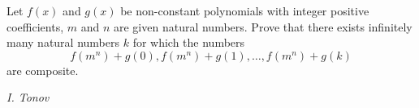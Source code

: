 Let $f(x)$ and $g(x)$ be non-constant polynomials with integer positive coefficients, $m$ and $n$ are given natural numbers. Prove that there exists infinitely many natural numbers $k$ for which the numbers
$$f(m^n)+g(0),f(m^n)+g(1),\ldots,f(m^n)+g(k)$$are composite.

\textit{I. Tonov}